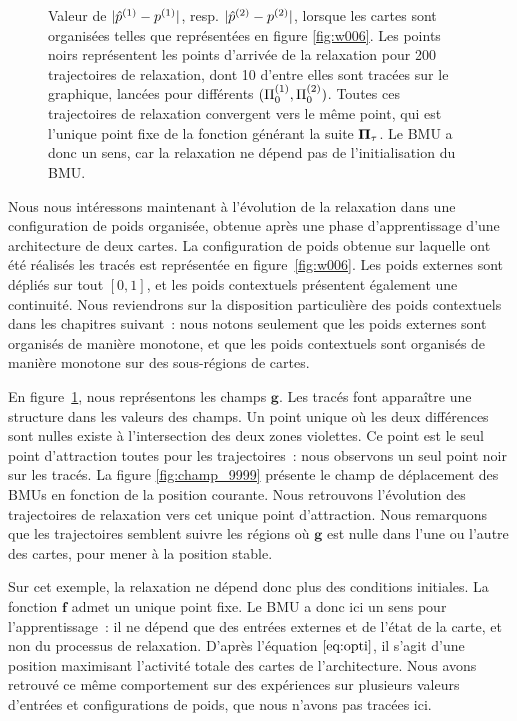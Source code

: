 \documentclass[../main]{subfiles}
\begin{document}
\begin{figure}
\begin{minipage}{0.5\textwidth}
	\end{minipage}
	\caption{Valeur de $\lvert{\hat{p}}^{({1})} - p^{({1})}\rvert$, resp. $\lvert{\hat{p}}^{({2})} - p^{({2})}\rvert$, lorsque les cartes sont organisées telles que représentées en figure \ref{fig:w006}. 
	Les points noirs représentent les points d'arrivée de la relaxation pour 200 trajectoires de relaxation, dont 10 d'entre elles sont tracées sur le graphique, lancées pour différents $(\Pi_0^{({1})}, \Pi_0^{({2})})$. Toutes ces trajectoires de relaxation convergent vers le même point, qui est l'unique point fixe de la fonction générant la suite $\mathbf{\Pi}_\tau$. Le BMU a donc un sens, car la relaxation ne dépend pas de l'initialisation du BMU.
	\label{fig:diff_relax_notraj}}
	\end{figure}

Nous nous intéressons maintenant à l'évolution de la relaxation dans une configuration de poids organisée, obtenue après une phase d'apprentissage d'une architecture de deux cartes.
La configuration de poids obtenue sur laquelle ont été réalisés les tracés est représentée en figure~\ref{fig:w006}. 
Les poids externes sont dépliés sur tout $[0,1]$, et les poids contextuels présentent également une continuité. Nous reviendrons sur la disposition particulière des poids contextuels dans les chapitres suivant~: nous notons seulement que les poids externes sont organisés de manière monotone, et que les poids contextuels sont organisés de manière monotone sur des sous-régions de cartes.

En figure~\ref{fig:diff_relax_notraj}, nous représentons les champs $\mathbf{g}$. 
Les tracés font apparaître une structure dans les valeurs des champs.
Un point unique où les deux différences sont nulles existe à l'intersection des deux zones violettes. Ce point est le seul point d'attraction toutes pour les trajectoires~: nous observons un seul point noir sur les tracés.
La figure \ref{fig:champ_9999} présente le champ de déplacement des BMUs en fonction de la position courante. 
Nous retrouvons l'évolution des trajectoires de relaxation vers cet unique point d'attraction. Nous remarquons que les trajectoires semblent suivre les régions où $\mathbf{g}$ est nulle dans l'une ou l'autre des cartes, pour mener à la position stable. 

Sur cet exemple, la relaxation ne dépend donc plus des conditions initiales. La fonction $\mathbf{f}$ admet un unique point fixe. 
Le BMU a donc ici un sens pour l'apprentissage~: il ne dépend que des entrées externes et de l'état de la carte, et non du processus de relaxation. D'après l'équation $\ref{eq:opti}$, il s'agit d'une position maximisant l'activité totale des cartes de l'architecture.
Nous avons retrouvé ce même comportement sur des expériences sur plusieurs valeurs d'entrées et configurations de poids, que nous n'avons pas tracées ici.
\end{document}
